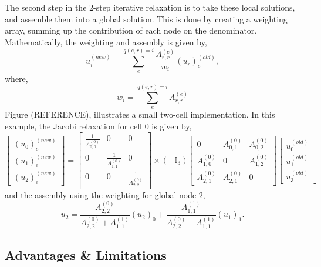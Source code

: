 The second step in the 2-step iterative relaxation is to take these local solutions, and assemble them into a global solution. This is done by creating a weighting array, summing up the contribution of each node on the denominator. Mathematically, the weighting and assembly is given by,
\begin{equation}\label{weight}
	u_i^{(new)} = \sum_e^{q(e,r) = i}\frac{A^{(e)}_{r,r}}{w_i} (u_r)_e^{(old)},
\end{equation}
where,
\begin{equation}
	w_i = \sum_e^{q(e,r) = i}A^{(e)}_{r,r}
\end{equation}
Figure (REFERENCE), illustrates a small two-cell implementation. In this example, the Jacobi relaxation for cell 0 is given by,
\begin{equation}
	\left[\begin{matrix}
		(u_0)_e^{(new)} \\
		(u_1)_e^{(new)} \\
		(u_2)_e^{(new)}
	\end{matrix}\right] = 
	\left[\begin{matrix}
		\frac{1}{A^{(0)}_{0,0}} & 0 & 0 \\
		0 & \frac{1}{A^{(0)}_{1,1}} & 0 \\
		0 & 0 & \frac{1}{A^{(0)}_{2,2}}
	\end{matrix} \right]
	\times (-\mathbb{I}_3)
	\left[\begin{matrix}
		0 & A^{(0)}_{0,1} & A^{(0)}_{0,2} \\
		A^{(0)}_{1,0} & 0 & A^{(0)}_{1,2} \\
		A^{(0)}_{2,1} & A^{(0)}_{2,1} & 0 
	\end{matrix}\right]
	\left[\begin{matrix}
		u_0^{(old)} \\
		u_1^{(old)} \\
		u_3^{(old)}
	\end{matrix}\right]
\end{equation}
and the assembly using the weighting for global node 2,
\begin{equation}
	u_2 = \frac{A^{(0)}_{2,2}}{A^{(0)}_{2,2} + A^{(1)}_{1,1} } (u_2)_0 + \frac{A^{(1)}_{1,1}}{A^{(0)}_{2,2} + A^{(1)}_{1,1} } (u_1)_1.
\end{equation}

\subsection{Advantages \& Limitations}

